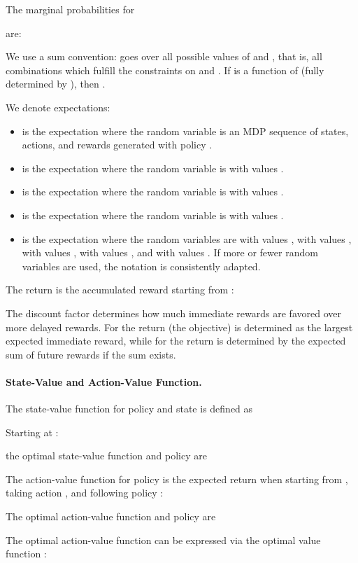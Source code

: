 \documentclass{article}
\begin{document}
\begin{appendices}
The marginal probabilities for 

are:



We use a sum convention:  goes over all possible values of
 and , that is, all combinations which fulfill the constraints
on  and . If  is a function of  (fully determined by ),
then .


We denote expectations:
\begin{itemize}
\item  is the expectation where
 the random variable is an MDP sequence of states, actions, and rewards
 generated with policy .
\item  is the expectation where
 the random variable is  with values .
\item  is the expectation where
 the random variable is  with values .
\item  is the expectation where
 the random variable is  with values .
\item  is the expectation where
  the random variables are  with values ,
   with values ,  with values , 
   with values ,  and  with values .
  If more or fewer random variables are used, the notation is
  consistently adapted. 
\end{itemize}


The return  is the accumulated reward starting from :

The discount factor  determines how much immediate rewards are
favored over more delayed rewards.
For  the return (the objective) is determined
as the largest expected immediate reward, while
for  the return is determined by the
expected sum of future rewards if the sum exists.


\paragraph{State-Value and Action-Value Function.}
The state-value function  for policy  and state 
is defined as

Starting at :

the optimal state-value function  and policy  are



The action-value function  for policy  is the
expected return when starting from , taking action ,
and following policy :

The optimal action-value function  and policy  are

The optimal action-value function  can be expressed via the optimal value
function  :


\end{appendices}
\end{document}
